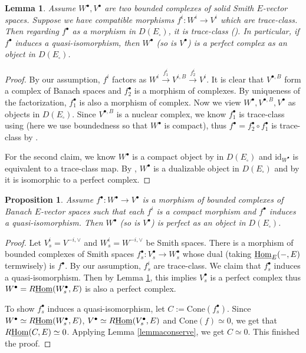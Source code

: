 \documentclass[a4paper,10pt]{amsart}
\theoremstyle{remark}
\theoremstyle{definition}
\theoremstyle{plain}
\newtheorem{lemma}[theorem]{Lemma}
\newtheorem{proposition}[theorem]{Proposition}
\numberwithin{equation}{section}
\newcommand{\Hom}{{\rm Hom}}
\newcommand{\uHom}{\underline{\Hom}}
\newcommand{\Cone}{\mathrm{Cone}}
\begin{document}
 \begin{lemma}\label{lemmatrace}
 	Assume $W^\bullet,V^\bullet$ are two bounded complexes of solid Smith $E$-vector spaces. Suppose we have compatible morphisms $f^i: W^i\to V^i$ which are trace-class. Then regarding $f^\bullet$ as a morphism in $D(E_\square)$, it is trace-class (\cite[Def.~8.1]{scholze2022complex}). In particular, if $f^\bullet$ induces a quasi-isomorphism, then $W^\bullet$ (so is $V^\bullet$) is a perfect complex as an object in $D(E_\square)$.
 \end{lemma}
 
 \begin{proof}
 	By our assumption, $f^i$ factors as $W^i\stackrel{f^i_1}\longrightarrow V^{i,B}\stackrel{f^i_2}\longrightarrow V^i$. It is clear that $V^{\bullet,B}$ form a complex of Banach spaces and $f^\bullet_2$ is a morphism of complexes. By uniqueness of the factorization, $f^\bullet_1$ is also a morphism of complex. Now we view $W^\bullet,V^{\bullet,B},V^\bullet$ as objects in $D(E_\square)$. Since $V^{\bullet,B}$ is a nuclear complex, we know $f^\bullet_1$ is trace-class using \cite[Lem.~A.14]{bosco2023rationalpadicHodge} (here we use boundedness so that $W^{\bullet}$ is compact), thus $f^\bullet=f_2^\bullet\circ f_1^\bullet$ is trace-class by \cite[Lem.~8.2]{scholze2022complex}.
 	
 	For the second claim, we know $W^\bullet$ is a compact object by \cite[Lem.~5.40]{andreychev2021pseudocoherent} in $D(E_\square)$ and $\mathrm{id}_{W^\bullet}$ is equivalent to a trace-class map. By \cite[Prop.~9.4]{scholze2022complex}, $W^\bullet$ is a dualizable object in $D(E_\square)$ and by \cite[Cor.~5.51.1]{andreychev2021pseudocoherent} it is isomorphic to a perfect complex.
 \end{proof}

 
\begin{proposition}\label{propfinite}
	Assume $f^\bullet: W^\bullet\to V^\bullet$ is a morphism of bounded complexes of Banach $E$-vector spaces such that each $f^i$ is a compact morphism and $f^\bullet$ induces a quasi-isomorphism. Then $W^\bullet$ (so is $V^\bullet$) is perfect as an object in $D(E_\square)$.
\end{proposition}
 
\begin{proof}
	Let $V_s^i=V^{-i,\vee}$ and $W_s^i=W^{-i,\vee}$ be Smith spaces. There is a morphism of bounded complexes of Smith spaces $f^\bullet_s: V_s^\bullet\to W^\bullet_s$ whose dual (taking $\uHom_{E}(-,E)$ termwisely) is $f^\bullet$. By our assumption, $f^i_s$ are trace-class. We claim that $f^\bullet_s$ induces a quasi-isomorphism. Then by Lemma \ref{lemmatrace}, this implies $V_s^\bullet$ is a perfect complex thus $W^\bullet=R\uHom(W_s^\bullet,E)$ is also a perfect complex.
	
	To show $f^\bullet_s$ induces a quasi-isomorphism, let $C:=\Cone(f_s^\bullet)$. Since $W^\bullet\simeq R\uHom(W_s^\bullet,E)$, $V^\bullet\simeq R\uHom(V_s^\bullet,E)$ and $\Cone(f)\simeq 0$, we get that $R\uHom(C,E)\simeq 0$. Applying Lemma \ref{lemmaconserve}, we get $C\simeq 0$. This finished the proof.
\end{proof}
\end{document}
